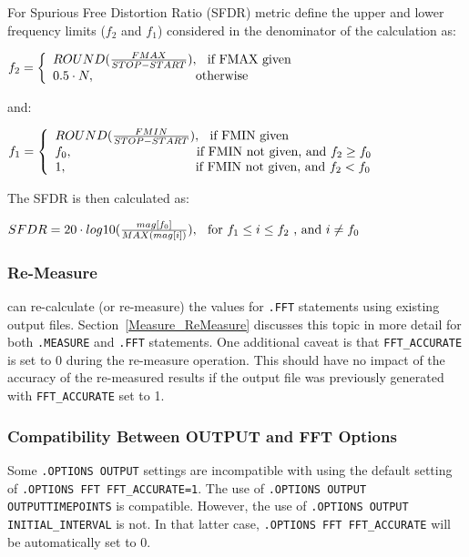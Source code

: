 For Spurious Free Distortion Ratio (SFDR) metric define the upper and lower frequency
limits ($f_{2}$ and $f_{1}$) considered in the denominator of the calculation as:

$f_{2}=\left\{\begin{array}{ll}ROUND(\frac{FMAX}{STOP-START}),\hspace*{0.1in}\textrm{if FMAX given} \\
 0.5 \cdot N,\hspace*{1.1in}\textrm{otherwise}\end{array}\right.$

and:

$f_{1}=\left\{\begin{array}{ll}ROUND(\frac{FMIN}{STOP-START}),\hspace*{0.1in}\textrm{if FMIN given} \\
 f_{0},\hspace*{1.35in}\textrm{if FMIN not given, and}~f_{2} \geq f_{0}\\
 1,\hspace*{1.4in}\textrm{if FMIN not given, and}~f_{2} < f_{0}\end{array}\right.$

The SFDR is then calculated as:

$SFDR = 20 \cdot log10(\frac{mag[f_{0}]}{MAX(mag[i])}), \hspace*{0.1in}\textrm{for}~f_{1} \leq i \leq f_{2}~\textrm{, and}~i \neq f_{0}$

\subsubsection{Re-Measure}
\label{Measure_FFT_ReMeasure}
\Xyce{} can re-calculate (or re-measure) the values for {\tt .FFT} statements
using existing \Xyce{} output files.  Section~\ref{Measure_ReMeasure} discusses
this topic in more detail for both {\tt .MEASURE} and {\tt .FFT} statements. One
additional caveat is that \texttt{FFT\_ACCURATE} is set to 0 during the re-measure
operation.  This should have no impact of the accuracy of the re-measured results
if the output file was previously generated with \texttt{FFT\_ACCURATE} set to 1.

\subsubsection{Compatibility Between OUTPUT and FFT Options}
Some \texttt{.OPTIONS OUTPUT} settings are incompatible with using the default
setting of \texttt{.OPTIONS FFT FFT\_ACCURATE=1}.  The use of
\texttt{.OPTIONS OUTPUT OUTPUTTIMEPOINTS} is compatible.  However, the use of
\texttt{.OPTIONS OUTPUT INITIAL\_INTERVAL} is not.  In that latter case,
\texttt{.OPTIONS FFT FFT\_ACCURATE} will be automatically set to 0.
